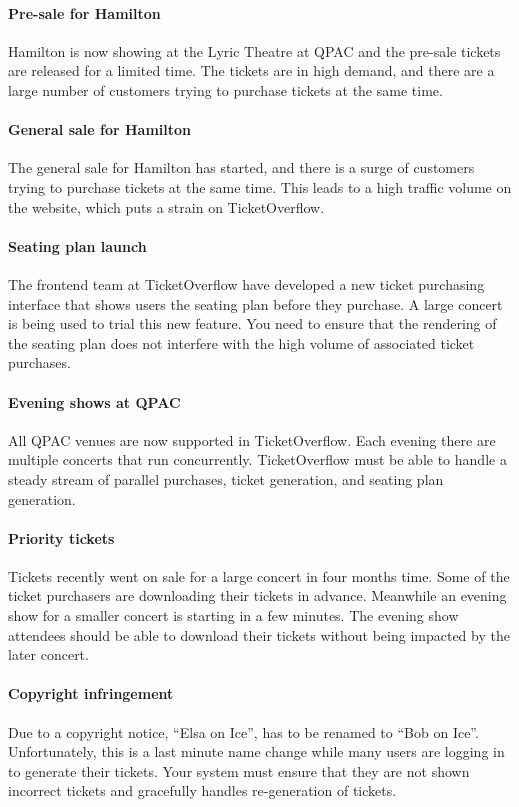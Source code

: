 \documentclass{csse4400}
\begin{document}
\paragraph{Pre-sale for Hamilton}
Hamilton is now showing at the Lyric Theatre at QPAC and the pre-sale tickets are released for a limited time.
The tickets are in high demand, and there are a large number of customers trying to purchase tickets at the same time.

\paragraph{General sale for Hamilton}
The general sale for Hamilton has started, and there is a surge of customers trying to purchase tickets at the same time.
This leads to a high traffic volume on the website, which puts a strain on TicketOverflow.

\paragraph{Seating plan launch}
The frontend team at TicketOverflow have developed a new ticket purchasing interface that shows users the seating plan before they purchase.
A large concert is being used to trial this new feature.
You need to ensure that the rendering of the seating plan does not interfere with the high volume of associated ticket purchases.

\paragraph{Evening shows at QPAC}
All QPAC venues are now supported in TicketOverflow.
Each evening there are multiple concerts that run concurrently.
TicketOverflow must be able to handle a steady stream of parallel purchases, ticket generation, and seating plan generation.

\paragraph{Priority tickets}
Tickets recently went on sale for a large concert in four months time.
Some of the ticket purchasers are downloading their tickets in advance.
Meanwhile an evening show for a smaller concert is starting in a few minutes.
The evening show attendees should be able to download their tickets without being impacted by the later concert.

\paragraph{Copyright infringement}
Due to a copyright notice, ``Elsa on Ice'', has to be renamed to ``Bob on Ice''.
Unfortunately, this is a last minute name change while many users are logging in to generate their tickets.
Your system must ensure that they are not shown incorrect tickets and gracefully handles re-generation of tickets.
\end{document}
